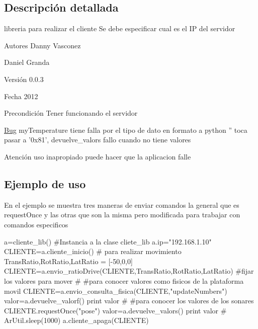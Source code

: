 \subsection{Descripción detallada}
libreria para realizar el cliente Se debe especificar cual es el IP del servidor \begin{DoxyAuthor}{Autores}
Danny Vasconez 

Daniel Granda 
\end{DoxyAuthor}
\begin{DoxyVersion}{Versión}
0.0.3 
\end{DoxyVersion}
\begin{DoxyDate}{Fecha}
2012 
\end{DoxyDate}
\begin{DoxyPrecond}{Precondición}
Tener funcionando el servidor 
\end{DoxyPrecond}
\begin{Desc}
\item[\hyperlink{bug__bug000001}{Bug}]myTemperature tiene falla por el tipo de dato en formato a python '' toca pasar a '0x81', devuelve\_\-valors fallo cuando no tiene valores \end{Desc}
\begin{DoxyWarning}{Atención}
uso inapropiado puede hacer que la aplicacion falle
\end{DoxyWarning}
\hypertarget{index_intro}{}\subsection{Ejemplo de uso}\label{index_intro}
En el ejemplo se muestra tres maneras de enviar comandos la general que es requestOnce y las otras que son la misma pero modificada para trabajar con comandos especificos 
\begin{DoxyVerbInclude}
a=cliente_lib() #Instancia a la clase cliete_lib
a.ip="192.168.1.10"
CLIENTE=a.cliente_inicio() 
# para realizar movimiento 
TransRatio,RotRatio,LatRatio = [-50,0,0]
CLIENTE=a.envio_ratioDrive(CLIENTE,TransRatio,RotRatio,LatRatio) #fijar los valores para mover
#
#para conocer valores como fisicos de la plataforma movil
CLIENTE=a.envio_consulta_fisica(CLIENTE,"updateNumbers")
valor=a.devuelve_valorf()
print valor
#
#para conocer los valores de los sonares
CLIENTE.requestOnce("pose")
valor=a.devuelve_valors()
print valor
#
ArUtil.sleep(1000)
a.cliente_apaga(CLIENTE)

\end{DoxyVerbInclude}
 

